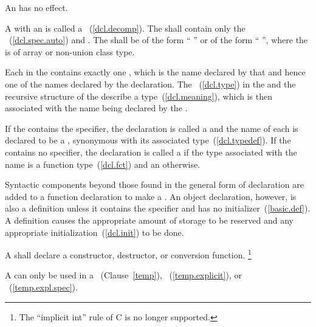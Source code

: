 \pnum
An  has no effect.

\pnum
A  with an  is called
a ~(\ref{dcl.decomp}). The  shall
contain only the  ~(\ref{dcl.spec.auto})
and . The 
shall be of the form ``\tcode{=} '' or of the
form ``\tcode{\{}  \tcode{\}}'', where the
 is of array or non-union class type.

\pnum
Each  in the 
contains exactly one , which is the name
declared by that  and hence one of the names
declared by the declaration. The
~(\ref{dcl.type}) in the
 and the recursive 
structure of the  describe a
type~(\ref{dcl.meaning}), which is then associated with the name being
declared by the .

\pnum
If the  contains the 
specifier, the declaration is called a  and the name
of each 
is declared to be a , synonymous with its
associated type~(\ref{dcl.typedef}). If the
 contains no  specifier, the
declaration is called a  if
the type associated with the name is a function type~(\ref{dcl.fct}) and
an  otherwise.

\pnum
{}%
Syntactic components beyond those found in the general form of
declaration are added to a function declaration to make a
. An object declaration, however, is also
a definition unless it contains the  specifier and has no
initializer~(\ref{basic.def}).
%
A
definition causes the appropriate amount of storage to be reserved and
any appropriate initialization~(\ref{dcl.init}) to be done.

\pnum
A  shall declare a
constructor, destructor, or conversion function.  \footnote{The
``implicit int'' rule of C is no longer supported.}
\begin{note}
A  can only be used in a
~(Clause~\ref{temp}),
~(\ref{temp.explicit}), or
~(\ref{temp.expl.spec}).
\end{note}

